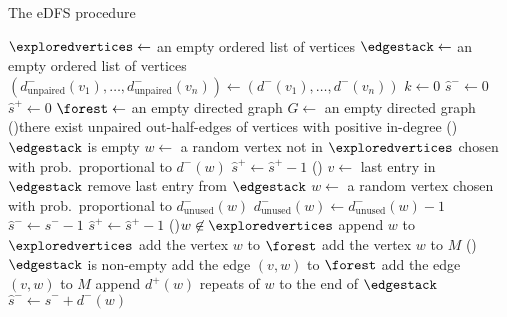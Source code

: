 \begin{algorithm}[htbp]
    \caption{The eDFS procedure \label{alg:edfs}}
\end{algorithm}



\begin{algorithm}[htbp]
    \SetAlgoLined
    $\exploredvertices \leftarrow$ an empty ordered list of vertices \;
    $\edgestack \leftarrow$ an empty ordered list of vertices \;
    $(d^-_{\mathrm{unpaired}}(v_1),\dots,d^-_{\mathrm{unpaired}}(v_n))\leftarrow (d^-(v_1),\dots,d^-(v_n))$  \;
    $k \leftarrow 0$  \;
    $\hat{s}^- \leftarrow 0$ \;
    $\hat{s}^+ \leftarrow 0$  \;
    $\forest \leftarrow$ an empty directed graph
    \;
     $G \leftarrow$ an empty directed graph
    \;
    \While(){there exist unpaired out-half-edges of vertices with positive in-degree}{
        \eIf(){$\edgestack$ is empty}{
            $w \leftarrow$ a random vertex not in $\exploredvertices$ chosen with prob.\ proportional to $d^-(w)$ \;
            $\hat{s}^+ \leftarrow \hat{s}^+ - 1$  \;
        }(){
            $v \leftarrow$ last entry in $\edgestack$ \;
            remove last entry from $\edgestack$ \;
            $w \leftarrow$ a random vertex chosen with prob.\ proportional to $d^-_{\mathrm{unused}}(w)$\;
            $d^-_{\mathrm{unused}}(w)\leftarrow d^-_{\mathrm{unused}}(w)-1$ \;
            $\hat{s}^- \leftarrow \hat{s}^- - 1$  \;
            $\hat{s}^+ \leftarrow \hat{s}^+ - 1$  \;
        }
        \eIf(){$w \not \in \exploredvertices$}{
            append $w$ to $\exploredvertices$ \; 
            add the vertex $w$ to $\forest$ \;
            add the vertex $w$ to $M$ \;
            \If(){$\edgestack$ is non-empty}{
                add the edge $(v, w)$ to $\forest$\;
                add the edge $(v, w)$ to $M$\;
            }
            append $d^+(w)$ repeats of $w$ to the end of $\edgestack$ \;
            $\hat{s}^- \leftarrow \hat{s}^- + d^-(w)$  \;
}}
\end{algorithm}
